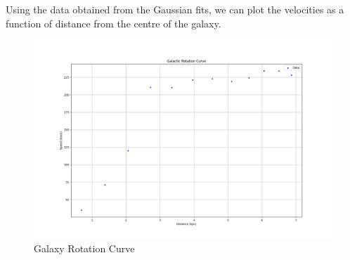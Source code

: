 Using the data obtained from the Gaussian fits, we can plot the velocities as a function of distance from the centre of the galaxy. 

\begin{figure}[H]
	\centering
	\includegraphics[width=\textwidth]{Images/galaxy_rotation_curve.png}
	\caption{Galaxy Rotation Curve}
	\label{fig:galaxy_rotation_curve}
\end{figure}